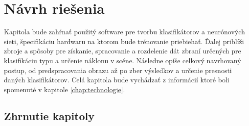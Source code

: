 \chapter{Návrh riešenia}
Kapitola bude zahŕnať použitý software pre tvorbu klasifikátorov a neurónových sieti, špecifikáciu hardwaru na ktorom bude trénovanie priebiehať.
Ďalej priblíži zbroje a spôsoby pre získanie, spracovanie a rozdelenie dát zbraní určených pre klasifikáciu typu a určenie náklonu v scéne.
Následne opíše celkový navrhovaný postup, od predspracovania obrazu až po zber výsledkov a určenie presnosti daných klasifikátorov.
Celá kapitola bude vychádzať z informácií ktoré boli spomenuté v kapitole \ref{chap:technologie}.












\section{Zhrnutie kapitoly}



\begin{comment}

    \section{Klasifikácia typu a určenie náklonu zbrane}
    Prvým bodom pri návrhu riešenia je výber programovacie jazyka a nástrojov, ktoré sú prispôsobné pre riešenie daného problému a tak uľahčujú výslednú implementáciu.
    Pre riešenie tejto práce bol vybraný programovací jazyk Python spolu s nástrojmi ktoré boli spomenúte už vyššie vid. sekcia \ref{sec:TensorflowKeras} a \ref{sec:scikitlearn}.
    Výsledny program bude mať za úlohu klasifikovať typ zbrane (krátka, dlhá) zo vstupného obrázku a následne určiť jej náklon.
    Pre klasifikáciu zbrane do daných kategórií sa ponúka niekoľko postupov klasifikácie, ktoré sú podrobne opísane v sekcíí \ref{sec:klasifikacia},
        pri určovaní náklonu zbrane v obraze môžeme použiť konvolučné neurónové siete.

\end{comment}


